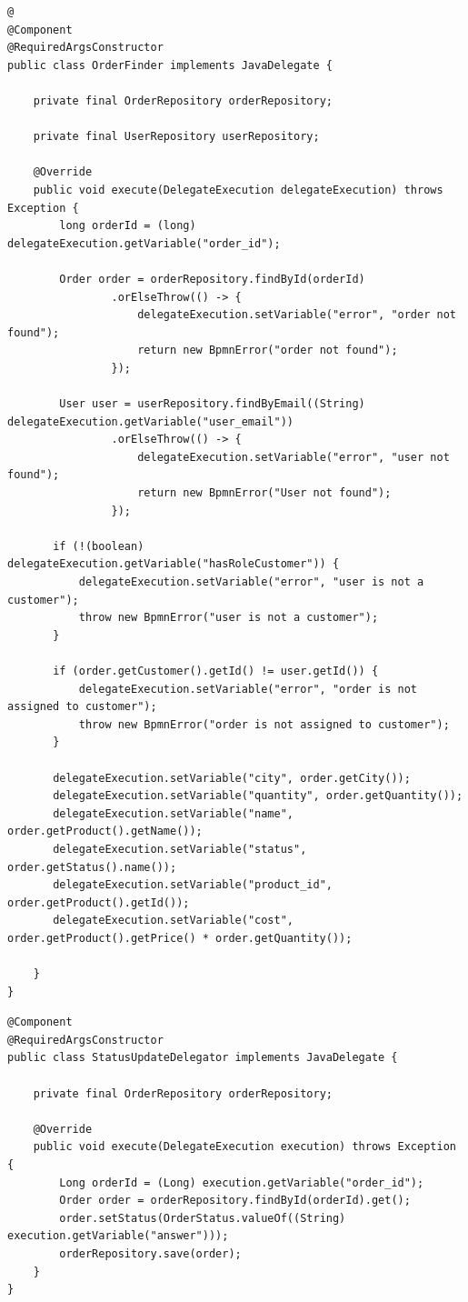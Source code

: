 \documentclass{article}
\begin{document}
\begin{lstlisting}
@
@Component
@RequiredArgsConstructor
public class OrderFinder implements JavaDelegate {

    private final OrderRepository orderRepository;

    private final UserRepository userRepository;

    @Override
    public void execute(DelegateExecution delegateExecution) throws Exception {
        long orderId = (long) delegateExecution.getVariable("order_id");

        Order order = orderRepository.findById(orderId)
                .orElseThrow(() -> {
                    delegateExecution.setVariable("error", "order not found");
                    return new BpmnError("order not found");
                });

        User user = userRepository.findByEmail((String) delegateExecution.getVariable("user_email"))
                .orElseThrow(() -> {
                    delegateExecution.setVariable("error", "user not found");
                    return new BpmnError("User not found");
                });

       if (!(boolean) delegateExecution.getVariable("hasRoleCustomer")) {
           delegateExecution.setVariable("error", "user is not a customer");
           throw new BpmnError("user is not a customer");
       }

       if (order.getCustomer().getId() != user.getId()) {
           delegateExecution.setVariable("error", "order is not assigned to customer");
           throw new BpmnError("order is not assigned to customer");
       }

       delegateExecution.setVariable("city", order.getCity());
       delegateExecution.setVariable("quantity", order.getQuantity());
       delegateExecution.setVariable("name", order.getProduct().getName());
       delegateExecution.setVariable("status", order.getStatus().name());
       delegateExecution.setVariable("product_id", order.getProduct().getId());
       delegateExecution.setVariable("cost", order.getProduct().getPrice() * order.getQuantity());

    }
}
\end{lstlisting}

\begin{lstlisting}
@Component
@RequiredArgsConstructor
public class StatusUpdateDelegator implements JavaDelegate {

    private final OrderRepository orderRepository;

    @Override
    public void execute(DelegateExecution execution) throws Exception {
        Long orderId = (Long) execution.getVariable("order_id");
        Order order = orderRepository.findById(orderId).get();
        order.setStatus(OrderStatus.valueOf((String) execution.getVariable("answer")));
        orderRepository.save(order);
    }
}
\end{lstlisting}
\end{document}
